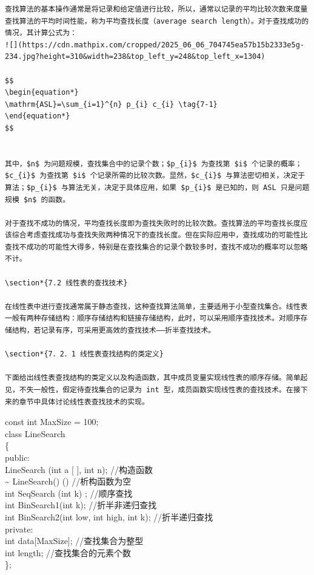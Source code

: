\documentclass[10pt]{article}
\begin{document}
\begin{verbatim}
查找算法的基本操作通常是将记录和给定值进行比较，所以，通常以记录的平均比较次数来度量查找算法的平均时间性能，称为平均查找长度（average search length）。对于查找成功的情况，其计算公式为：
![](https://cdn.mathpix.com/cropped/2025_06_06_704745ea57b15b2333e5g-234.jpg?height=310&width=238&top_left_y=248&top_left_x=1304)

$$
\begin{equation*}
\mathrm{ASL}=\sum_{i=1}^{n} p_{i} c_{i} \tag{7-1}
\end{equation*}
$$


其中，$n$ 为问题规模，查找集合中的记录个数；$p_{i}$ 为查找第 $i$ 个记录的概率；$c_{i}$ 为查找第 $i$ 个记录所需的比较次数。显然，$c_{i}$ 与算法密切相关，决定于算法；$p_{i}$ 与算法无关，决定于具体应用，如果 $p_{i}$ 是已知的，则 ASL 只是问题规模 $n$ 的函数。

对于查找不成功的情况，平均查找长度即为查找失败时的比较次数。查找算法的平均查找长度应该综合考虑查找成功与查找失败两种情况下的查找长度。但在实际应用中，查找成功的可能性比查找不成功的可能性大得多，特别是在查找集合的记录个数较多时，查找不成功的概率可以忽略不计。

\section*{7.2 线性表的查找技术}

在线性表中进行查找通常属于静态查找，这种查找算法简单，主要适用于小型查找集合。线性表一般有两种存储结构：顺序存储结构和链接存储结构，此时，可以采用顺序查找技术。对顺序存储结构，若记录有序，可采用更高效的查找技术——折半查找技术。

\section*{7．2．1 线性表查找结构的类定义}

下面给出线性表查找结构的类定义以及构造函数，其中成员变量实现线性表的顺序存储。简单起见，不失一般性，假定待查找集合的记录为 int 型，成员函数实现线性表的查找技术。在接下来的章节中具体讨论线性表查找技术的实现。
\end{verbatim}

const int MaxSize = 100;\\
class LineSearch\\
\{\\
public:\\[0pt]
LineSearch (int a [ ], int n); //构造函数\\
\~{} LineSearch() () //析构函数为空\\
int SeqSearch (int k) ; //顺序查找\\
int BinSearch1(int k); //折半非递归查找\\
int BinSearch2(int low, int high, int k); //折半递归查找\\
private:\\[0pt]
int data[MaxSize]; //查找集合为整型\\
int length; //查找集合的元素个数\\
\};
\end{document}
